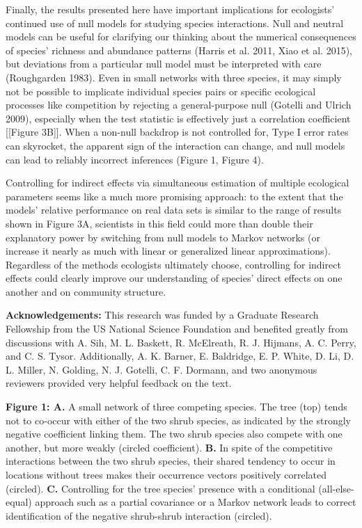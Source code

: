 \documentclass[12pt,]{article}
\begin{document}
\begin{spacing}{1.9}
\begin{flushleft}
Finally, the results presented here have important implications for
ecologists' continued use of null models for studying species
interactions. Null and neutral models can be useful for clarifying our
thinking about the numerical consequences of species' richness and
abundance patterns (Harris et al. 2011, Xiao et al. 2015), but
deviations from a particular null model must be interpreted with care
(Roughgarden 1983). Even in small networks with three species, it may
simply not be possible to implicate individual species pairs or specific
ecological processes like competition by rejecting a general-purpose
null (Gotelli and Ulrich 2009), especially when the test statistic is
effectively just a correlation coefficient {[}{[}Figure 3B{]}{]}. When a
non-null backdrop is not controlled for, Type I error rates can
skyrocket, the apparent sign of the interaction can change, and null
models can lead to reliably incorrect inferences (Figure 1, Figure 4).

Controlling for indirect effects via simultaneous estimation of multiple
ecological parameters seems like a much more promising approach: to the
extent that the models' relative performance on real data sets is
similar to the range of results shown in Figure 3A, scientists in this
field could more than double their explanatory power by switching from
null models to Markov networks (or increase it nearly as much with
linear or generalized linear approximations). Regardless of the methods
ecologists ultimately choose, controlling for indirect effects could
clearly improve our understanding of species' direct effects on one
another and on community structure.

\noindent \textbf{Acknowledgements:} This research was funded by a
Graduate Research Fellowship from the US National Science Foundation and
benefited greatly from discussions with A. Sih, M. L. Baskett, R.
McElreath, R. J. Hijmans, A. C. Perry, and C. S. Tysor. Additionally, A.
K. Barner, E. Baldridge, E. P. White, D. Li, D. L. Miller, N. Golding,
N. J. Gotelli, C. F. Dormann, and two anonymous reviewers provided very
helpful feedback on the text.

\setlength{\parindent}{0cm}

\noindent \textbf{Figure 1: A.} A small network of three competing
species. The tree (top) tends not to co-occur with either of the two
shrub species, as indicated by the strongly negative coefficient linking
them. The two shrub species also compete with one another, but more
weakly (circled coefficient). \textbf{B.} In spite of the competitive
interactions between the two shrub species, their shared tendency to
occur in locations without trees makes their occurrence vectors
positively correlated (circled). \textbf{C.} Controlling for the tree
species' presence with a conditional (all-else-equal) approach such as a
partial covariance or a Markov network leads to correct identification
of the negative shrub-shrub interaction (circled).


\end{flushleft}
\end{spacing}
\end{document}
